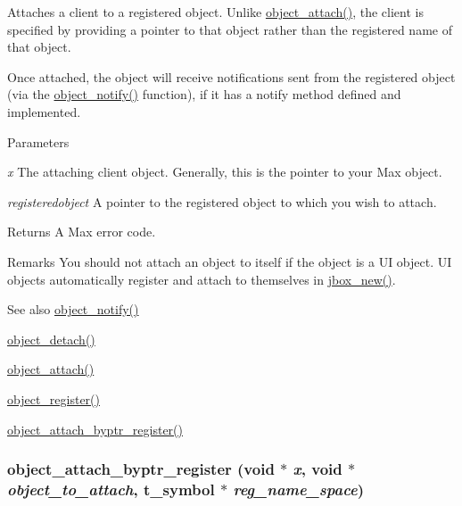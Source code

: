 Attaches a client to a registered object. Unlike \hyperlink{group__obj_ga42025069e4317aef6dbe5c21c316fd85}{object\_\-attach()}, the client is specified by providing a pointer to that object rather than the registered name of that object.

Once attached, the object will receive notifications sent from the registered object (via the \hyperlink{group__obj_ga6297b81c3a70f7fb2201c7262e96bba3}{object\_\-notify()} function), if it has a {\ttfamily notify} method defined and implemented.


\begin{DoxyParams}{Parameters}
\item[{\em x}]The attaching client object. Generally, this is the pointer to your Max object. \item[{\em registeredobject}]A pointer to the registered object to which you wish to attach. \end{DoxyParams}
\begin{DoxyReturn}{Returns}
A Max error code.
\end{DoxyReturn}
\begin{DoxyRemark}{Remarks}
You should not attach an object to itself if the object is a UI object. UI objects automatically register and attach to themselves in \hyperlink{group__jbox_gaaa460d02ca3d22c54368ade59d8e330b}{jbox\_\-new()}.
\end{DoxyRemark}
\begin{DoxySeeAlso}{See also}
\hyperlink{group__obj_ga6297b81c3a70f7fb2201c7262e96bba3}{object\_\-notify()} 

\hyperlink{group__obj_ga6765e9533a3ae0d67d302f1e038c66ac}{object\_\-detach()} 

\hyperlink{group__obj_ga42025069e4317aef6dbe5c21c316fd85}{object\_\-attach()} 

\hyperlink{group__obj_gaaa97beba179d6aebd3f3ede1b5c781fa}{object\_\-register()} 

\hyperlink{group__obj_ga73adb1c1e2db98f7a500f50ac447add5}{object\_\-attach\_\-byptr\_\-register()} 
\end{DoxySeeAlso}
\hypertarget{group__obj_ga73adb1c1e2db98f7a500f50ac447add5}{
\subsubsection[{object\_\-attach\_\-byptr\_\-register}]{ object\_\-attach\_\-byptr\_\-register (void $\ast$ {\em x}, \/  void $\ast$ {\em object\_\-to\_\-attach}, \/  {\bf t\_\-symbol} $\ast$ {\em reg\_\-name\_\-space})}}
\label{group__obj_ga73adb1c1e2db98f7a500f50ac447add5}


